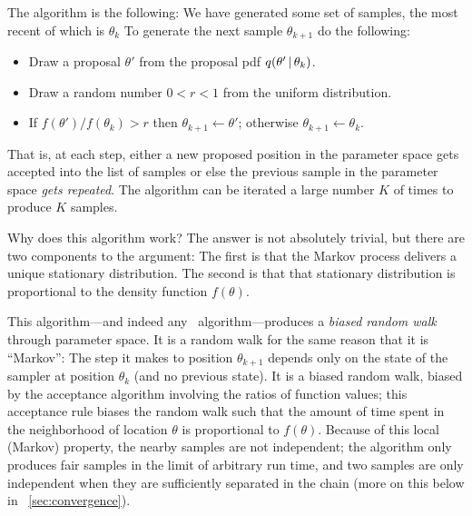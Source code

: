 \documentclass[modern]{aastex61}
\newcommand{\MCMC}{\acronym{MCMC}}
\newcommand{\pars}{\theta}
\begin{document}
The algorithm is the
following: We have generated some set of samples, the most recent of
which is $\pars_k$ To generate the next sample $\pars_{k+1}$ do the
following:
\begin{itemize}
\item Draw a proposal $\pars'$ from the proposal pdf $q(\pars'\given\pars_k)$.
\item Draw a random number $0<r<1$ from the uniform distribution.
\item If $f(\pars') / f(\pars_k) > r$ then $\pars_{k+1} \leftarrow \pars'$;
      otherwise $\pars_{k+1} \leftarrow \pars_k$.
\end{itemize}
That is, at each step, either a new proposed position in the parameter
  space gets accepted into the list of samples or else the previous sample
  in the parameter space \emph{gets repeated}.
The algorithm can be iterated a large number $K$ of times to produce $K$ samples.

Why does this algorithm work?  The answer is not absolutely
trivial,
but there are two components to the argument:
The first is that the Markov process delivers a unique stationary
distribution.
The second is that that stationary distribution is proportional to the
density function $f(\pars)$.

This algorithm---and indeed any \MCMC\ algorithm---produces a
  \emph{biased random walk} through parameter space.
It is a random walk for the same reason that it is ``Markov'':
The step it makes to position $\pars_{k+1}$ depends only on the state
  of the sampler at position $\pars_k$ (and no previous state).
It is a biased random walk, biased by the acceptance algorithm
  involving the ratios of function values; this acceptance rule biases
  the random walk such that the amount of time spent in the neighborhood
  of location $\pars$ is proportional to $f(\pars)$.
Because of this local (Markov) property, the nearby samples are not
  independent; the algorithm only produces fair samples in the limit of
  arbitrary run time, and two samples are only independent when they are
  sufficiently separated in the chain (more on this below in \sectionname~\ref{sec:convergence}).
\end{document}
